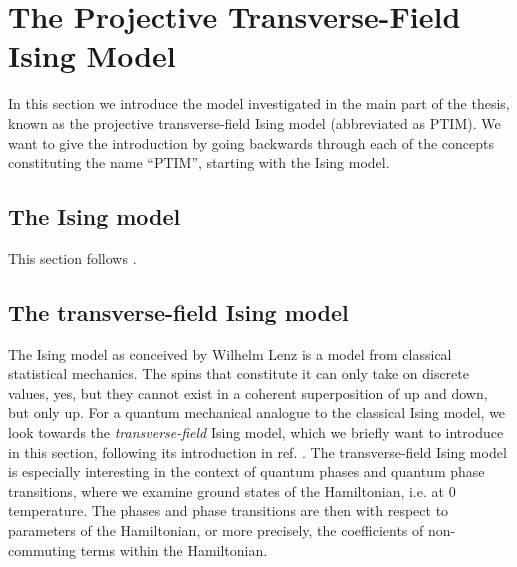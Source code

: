\clearpage
\section{The Projective Transverse-Field Ising Model}\label{sec:intro-ptim}
In this section we introduce the model investigated in the main part of the
thesis, known as the projective transverse-field Ising model (abbreviated as
PTIM). We want to give the introduction by going backwards through each of the
concepts constituting the name \enquote{PTIM}, starting with the Ising model.
\subsection{The Ising model}

This section follows \cite{blundellMagnetismCondensedMatter2011}.

\subsection{The transverse-field Ising model}

The Ising model as conceived by Wilhelm Lenz is a model from classical
statistical mechanics. The spins that constitute it can only take on discrete
values, yes, but they cannot exist in a coherent superposition of up and down,
but only up. For a quantum mechanical analogue to the classical Ising model, we
look towards the \emph{transverse-field} Ising model, which we briefly want to
introduce in this section, following its introduction in ref.
\cite{langLectureNotesTopological2021}.  The transverse-field Ising model is
especially interesting in the context of quantum phases and quantum phase
transitions, where we examine ground states of the Hamiltonian, i.e. at $0$
temperature. The phases and phase transitions are then with respect to
parameters of the Hamiltonian, or more precisely, the coefficients of
non-commuting terms within the Hamiltonian.

